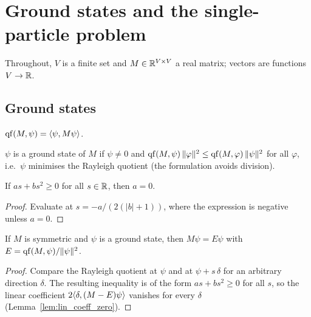 \chapter{Ground states and the single-particle problem}
\label{chap:ground_states}

Throughout, $V$ is a finite set and $M\in\mathbb{R}^{V\times V}$ a real matrix; vectors are functions $V\to\mathbb{R}$.

\section{Ground states}

\begin{definition}
  \label{def:qf}
  \leanok
  $\operatorname{qf}(M,\psi) = \langle \psi, M\psi\rangle$.
\end{definition}

\begin{definition}
  \label{def:IsGroundState}
  \leanok
  $\psi$ is a ground state of $M$ if $\psi\neq 0$ and
  $\operatorname{qf}(M,\psi)\,\|\varphi\|^2 \le \operatorname{qf}(M,\varphi)\,\|\psi\|^2$ for all $\varphi$, i.e.\ $\psi$ minimises the
  Rayleigh quotient (the formulation avoids division).
\end{definition}

\begin{lemma}
  \label{lem:lin_coeff_zero}
  \leanok
  If $a s + b s^2\ge 0$ for all $s\in\mathbb{R}$, then $a=0$.
\end{lemma}
\begin{proof}
  \leanok
  Evaluate at $s=-a/(2(|b|+1))$, where the expression is negative unless $a=0$.
\end{proof}

\begin{theorem}
  \label{thm:isGroundState_eigen}
  \leanok
  If $M$ is symmetric and $\psi$ is a ground state, then $M\psi = E\psi$ with
  $E=\operatorname{qf}(M,\psi)/\|\psi\|^2$.
\end{theorem}
\begin{proof}
  \leanok
  Compare the Rayleigh quotient at $\psi$ and at $\psi+s\,\delta$ for an arbitrary direction $\delta$. The
  resulting inequality is of the form $as+bs^2\ge0$ for all $s$, so the linear coefficient
  $2\langle \delta, (M-E)\psi\rangle$ vanishes for every $\delta$ (Lemma~\ref{lem:lin_coeff_zero}).
\end{proof}

